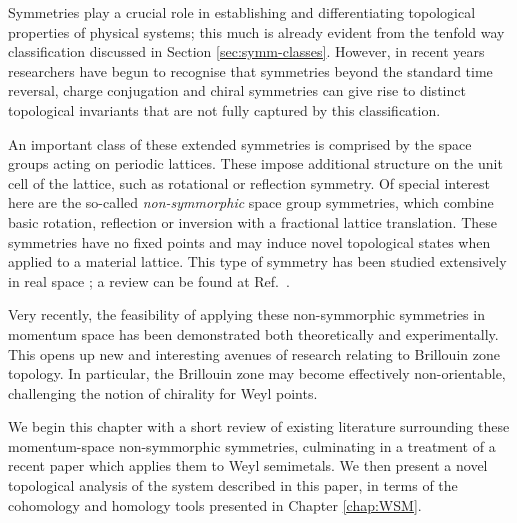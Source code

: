 
Symmetries play a crucial role in establishing and differentiating topological properties of physical systems; this much is already evident from the tenfold way classification discussed in Section \ref{sec:symm-classes}. However, in recent years researchers have begun to recognise that symmetries beyond the standard time reversal, charge conjugation and chiral symmetries can give rise to distinct topological invariants that are not fully captured by this classification.

An important class of these extended symmetries is comprised by the space groups acting on periodic lattices. These impose additional structure on the unit cell of the lattice, such as rotational or reflection symmetry. Of special interest here are the so-called \emph{non-symmorphic} space group symmetries, which combine basic rotation, reflection or inversion with a fractional lattice translation. These symmetries have no fixed points and may induce novel topological states when applied to a material lattice. This type of symmetry has been studied extensively in real space \cite{Wang_hourglass,Chen_nonsymmorphic-semimetal,Kim_glide-semimetal,Shiozaki_nonsymmorphic-topology,Bzdusek_nodal-chain,Wieder_layer-semimetal,Zhao_nonsymmorphic-semimetal,Yang_nonsymmorphic-semimetal,Wang_hourglass-semimetal,Wang_hourglass-Dirac,Wieder_wallpaper-fermions,Xiao_hourglass-Weyl}; a review can be found at Ref.~\cite{Zhang_nonsymmorphic-review}.

Very recently, the feasibility of applying these non-symmorphic symmetries in momentum space has been demonstrated both theoretically and experimentally. This opens up new and interesting avenues of research relating to Brillouin zone topology. In particular, the Brillouin zone may become effectively non-orientable, challenging the notion of chirality for Weyl points.

We begin this chapter with a short review of existing literature surrounding these momentum-space non-symmorphic symmetries, culminating in a treatment of a recent paper which applies them to Weyl semimetals. We then present a novel topological analysis of the system described in this paper, in terms of the cohomology and homology tools presented in Chapter \ref{chap:WSM}.



